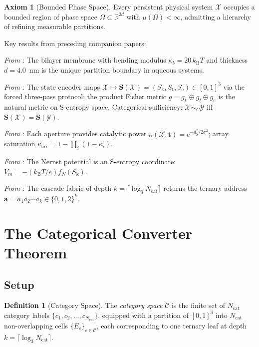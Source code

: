 \documentclass[11pt,twocolumn,a4paper]{article}
\theoremstyle{definition}
\newtheorem{definition}[theorem]{Definition}
\newtheorem{axiom}{Axiom}
\theoremstyle{remark}
\newcommand{\kB}{k_{\mathrm{B}}}
\newcommand{\Sk}{S_{\mathrm{k}}}
\newcommand{\St}{S_{\mathrm{t}}}
\newcommand{\Se}{S_{\mathrm{e}}}
\newcommand{\Sent}{\bm{S}}
\newcommand{\kap}{\kappa}
\begin{document}
\begin{axiom}[Bounded Phase Space]
\label{ax:bps}
Every persistent physical system $\mathcal{X}$ occupies a bounded region of
phase space $\Omega \subset \mathbb{R}^{2d}$ with $\mu(\Omega) < \infty$,
admitting a hierarchy of refining measurable partitions.
\end{axiom}

\noindent Key results from preceding companion papers:

\noindent\textit{From \citep{companion1}}: The bilayer membrane with bending
modulus $\kap_b = 20\,\kB T$ and thickness $d = 4.0$~nm is the unique partition
boundary in aqueous systems.

\noindent\textit{From \citep{companion2}}: The state encoder maps
$\mathcal{X} \mapsto \Sent(\mathcal{X}) = (\Sk, \St, \Se) \in [0,1]^3$
via the forced three-pass protocol; the product Fisher metric
$g = g_k \oplus g_t \oplus g_e$ is the natural metric on S-entropy space.
Categorical sufficiency: $\mathcal{X} \sim_C \mathcal{Y}$ iff
$\Sent(\mathcal{X}) = \Sent(\mathcal{Y})$.

\noindent\textit{From \citep{companion3}}: Each aperture provides catalytic power
$\kap(\mathcal{X}; \mathbf{t}) = e^{-d_g^2/2\sigma^2}$; array saturation
$\kap_{\mathrm{arr}} = 1 - \prod_i(1-\kap_i)$.

\noindent\textit{From \citep{companion4}}: The Nernst potential is an S-entropy
coordinate: $V_m = -(\kB T / e) f_N(\Sk)$.

\noindent\textit{From \citep{companion5}}: The cascade fabric of depth
$k = \lceil\log_3 N_{\mathrm{cat}}\rceil$ returns the ternary address
$\mathbf{a} = a_1 a_2 \cdots a_k \in \{0,1,2\}^k$.

\section{The Categorical Converter Theorem}
\label{sec:catconv}

\subsection{Setup}

\begin{definition}[Category Space]
\label{def:catspace}
The \emph{category space} $\mathcal{C}$ is the finite set of $N_{\mathrm{cat}}$
category labels $\{c_1, c_2, \ldots, c_{N_{\mathrm{cat}}}\}$, equipped with
a partition of $[0,1]^3$ into $N_{\mathrm{cat}}$ non-overlapping cells
$\{E_c\}_{c \in \mathcal{C}}$, each corresponding to one ternary leaf at
depth $k = \lceil\log_3 N_{\mathrm{cat}}\rceil$.
\end{definition}
\end{document}
